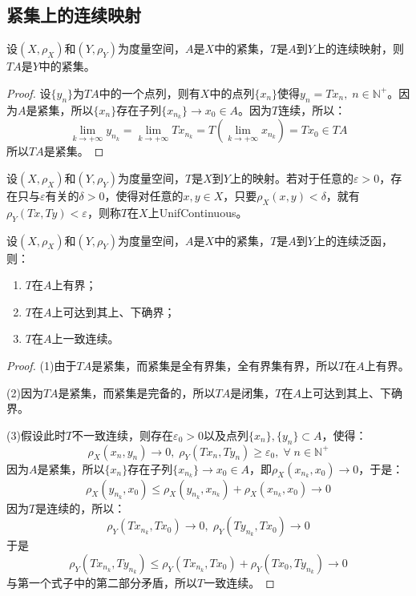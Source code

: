 \subsection{紧集上的连续映射}
\begin{theorem}
	设$(X,\rho_X)$和$(Y,\rho_Y)$为度量空间，$A$是$X$中的紧集，$T$是$A$到$Y$上的连续映射，则$TA$是$Y$中的紧集。
\end{theorem}
\begin{proof}
	设$\{y_n\}$为$TA$中的一个点列，则有$X$中的点列$\{x_n\}$使得$y_n=Tx_n,\;n\in\mathbb{N}^+$。因为$A$是紧集，所以$\{x_n\}$存在子列$\{x_{n_k}\}\to x_0\in A$。因为$T$连续，所以：
	\begin{equation*}
		\lim_{k\to+\infty}y_{n_k}=\lim_{k\to+\infty}Tx_{n_k}=T\left(\lim_{k\to+\infty}x_{n_k}\right)=Tx_0\in TA
	\end{equation*}
	所以$TA$是紧集。
\end{proof}
\begin{definition}
	设$(X,\rho_X)$和$(Y,\rho_Y)$为度量空间，$T$是$X$到$Y$上的映射。若对于任意的$\varepsilon>0$，存在只与$\varepsilon$有关的$\delta>0$，使得对任意的$x,y\in X$，只要$\rho_X(x,y)<\delta$，就有$\rho_Y(Tx,Ty)<\varepsilon$，则称$T$在$X$上\gls{UnifContinuous}。
\end{definition}
\begin{corollary}
	设$(X,\rho_X)$和$(Y,\rho_Y)$为度量空间，$A$是$X$中的紧集，$T$是$A$到$Y$上的连续泛函，则：
	\begin{enumerate}
		\item $T$在$A$上有界；
		\item $T$在$A$上可达到其上、下确界；
		\item $T$在$A$上一致连续。
	\end{enumerate}
\end{corollary}
\begin{proof}
	(1)由于$TA$是紧集，而紧集是全有界集，全有界集有界，所以$T$在$A$上有界。\par
	(2)因为$TA$是紧集，而紧集是完备的，所以$TA$是闭集，$T$在$A$上可达到其上、下确界。\par
	(3)假设此时$T$不一致连续，则存在$\varepsilon_0>0$以及点列$\{x_n\},\{y_n\}\subset A$，使得：
	\begin{equation*}
		\rho_X(x_n,y_n)\to0,\;\rho_Y(Tx_n,Ty_n)\geqslant\varepsilon_0,\;\forall\;n\in\mathbb{N}^+
	\end{equation*}
	因为$A$是紧集，所以$\{x_n\}$存在子列$\{x_{n_k}\}\to x_0\in A$，即$\rho_X(x_{n_k},x_0)\to 0$，于是：
	\begin{equation*}
		\rho_X(y_{n_k},x_0)\leqslant\rho_X(y_{n_k},x_{n_k})+\rho_X(x_{n_k},x_0)\to0
	\end{equation*}
	因为$T$是连续的，所以：
	\begin{equation*}
		\rho_Y(Tx_{n_k},Tx_0)\to0,\;\rho_Y(Ty_{n_k},Tx_0)\to0
	\end{equation*}
	于是
	\begin{equation*}
		\rho_Y(Tx_{n_k},Ty_{n_k})\leqslant\rho_Y(Tx_{n_k},Tx_0)+\rho_Y(Tx_0,Ty_{n_k})\to 0
	\end{equation*}
	与第一个式子中的第二部分矛盾，所以$T$一致连续。
\end{proof}
